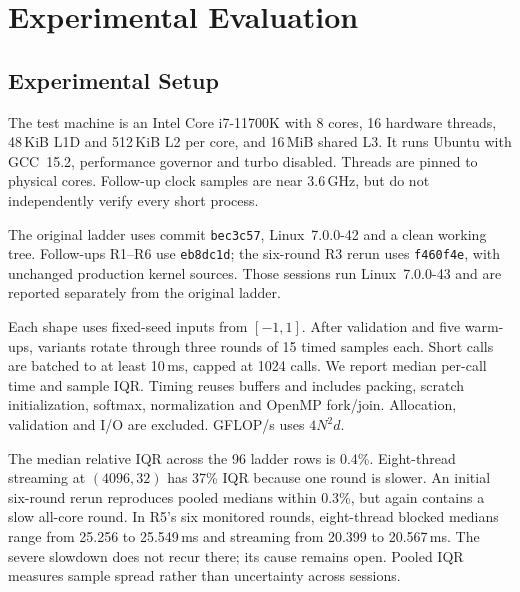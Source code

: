 \documentclass[11pt,a4paper]{article}
\begin{document}
\section{Experimental Evaluation}
\subsection{Experimental Setup}
The test machine is an Intel Core i7-11700K with 8 cores, 16 hardware threads,
48\,KiB L1D and 512\,KiB L2 per core, and 16\,MiB shared L3. It runs Ubuntu
with GCC~15.2, performance governor and turbo disabled. Threads are pinned
to physical cores. Follow-up clock samples are near 3.6\,GHz, but do not
independently verify every short process.

The original ladder uses commit \texttt{bec3c57}, Linux~7.0.0-42 and a clean
working tree. Follow-ups R1--R6 use \texttt{eb8dc1d}; the six-round R3 rerun
uses \texttt{f460f4e}, with unchanged production kernel sources. Those sessions
run Linux~7.0.0-43 and are reported separately from the original ladder.

Each shape uses fixed-seed inputs from $[-1,1]$. After validation and five
warm-ups, variants rotate through three rounds of 15 timed samples each.
Short calls are batched to at least 10\,ms, capped at 1024 calls.
We report median per-call time and sample IQR. Timing reuses buffers and
includes packing, scratch initialization, softmax, normalization and OpenMP
fork/join. Allocation, validation and I/O are excluded. GFLOP/s uses $4N^2d$.

The median relative IQR across the 96 ladder rows is 0.4\%. Eight-thread
streaming at $(4096,32)$ has 37\% IQR because one round is slower.
An initial six-round rerun reproduces pooled medians within 0.3\%, but again
contains a slow all-core round. In R5's six monitored rounds, eight-thread
blocked medians range from 25.256 to 25.549\,ms and streaming from 20.399 to
20.567\,ms. The severe slowdown does not recur there; its cause remains open.
Pooled IQR measures sample spread rather than uncertainty across sessions.
\end{document}

